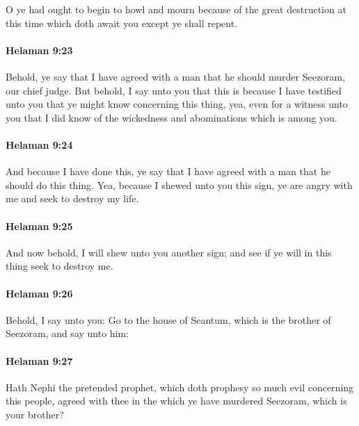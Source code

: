 			O ye had ought to begin to howl and mourn
			because of the great destruction
			at this time which doth await you
			except ye shall repent.

		\paragraph{Helaman 9:23} %
			\label{HELAMAN-9-23}

			Behold, ye say that I have agreed with a man
			that he should murder Seezoram, our chief judge.
			But behold, I say unto you
			that this is because I have testified unto you
			that ye might know concerning this thing,
			yea, even for a witness unto you
			that I did know of the wickedness and abominations which is among you.

		\paragraph{Helaman 9:24} %
			\label{HELAMAN-9-24}

			And because I have done this,
			ye say that I have agreed with a man that he should do this thing.
			Yea, because I shewed unto you this sign,
			ye are angry with me and seek to destroy my life.

		\paragraph{Helaman 9:25} %
			\label{HELAMAN-9-25}

			And now behold, I will shew unto you another sign;
			and see if ye will in this thing seek to destroy me.

		\paragraph{Helaman 9:26} %
			\label{HELAMAN-9-26}

			Behold, I say unto you:
			Go to the house of Seantum, which is the brother of Seezoram,
			and say unto him:

		\paragraph{Helaman 9:27} %
			\label{HELAMAN-9-27}

			Hath Nephi the pretended prophet,
			which doth prophesy so much evil concerning this people,
			agreed with thee in the which ye have murdered Seezoram, which is your brother?

